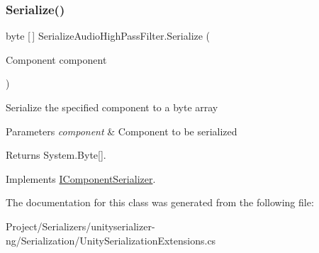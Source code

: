\subsubsection{\texorpdfstring{Serialize()}{Serialize()}}
{\footnotesize\ttfamily byte \mbox{[}$\,$\mbox{]} Serialize\+Audio\+High\+Pass\+Filter.\+Serialize (\begin{DoxyParamCaption}\item[{Component}]{component }\end{DoxyParamCaption})\hspace{0.3cm}{\ttfamily [inline]}}



Serialize the specified component to a byte array 


\begin{DoxyParams}{Parameters}
{\em component} & Component to be serialized\\
\hline
\end{DoxyParams}
\begin{DoxyReturn}{Returns}
System.\+Byte\mbox{[}\mbox{]}.
\end{DoxyReturn}


Implements \hyperlink{interface_i_component_serializer_ab2aa38005665496b62d6c54b5f0dbd31}{I\+Component\+Serializer}.



The documentation for this class was generated from the following file\+:\begin{DoxyCompactItemize}
\item 
Project/\+Serializers/unityserializer-\/ng/\+Serialization/Unity\+Serialization\+Extensions.\+cs\end{DoxyCompactItemize}
